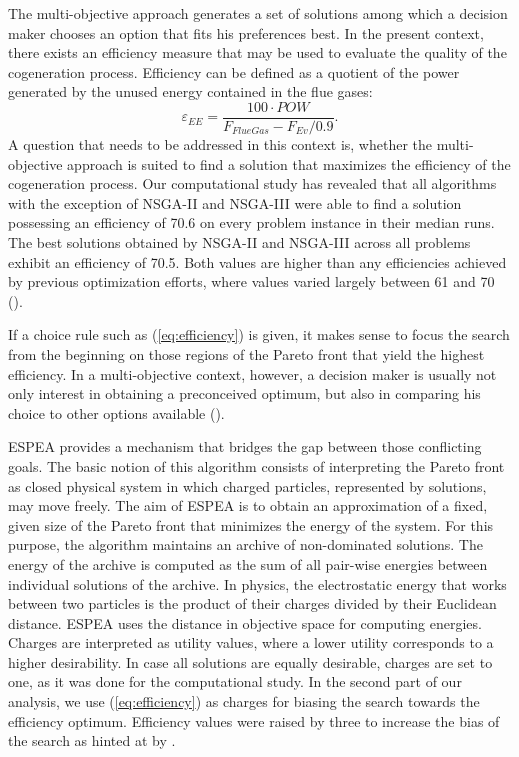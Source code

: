 The multi-objective approach generates a set of solutions among which a decision maker chooses an option that fits his preferences best. In the present context, there exists an efficiency measure that may be used to evaluate the quality of the cogeneration process. Efficiency can be defined as a quotient of the power generated by the unused energy contained in the flue gases:
%
\begin{equation}
\label{eq:efficiency}
\varepsilon_{EE} = \frac{100 \cdot POW}{F_{FlueGas} - F_{Ev}/0.9}.
\end{equation}
%
A question that needs to be addressed in this context is, whether the multi-objective approach is suited to find a solution that maximizes the efficiency of the cogeneration process. Our computational study has revealed that all algorithms with the exception of NSGA-II and NSGA-III were able to find a solution possessing an efficiency of 70.6 on every problem instance in their median runs. The best solutions obtained by NSGA-II and NSGA-III across all problems exhibit an efficiency of 70.5. Both values are higher than any efficiencies achieved by previous optimization efforts, where values varied largely between 61 and 70 (\cite[Fig. 11]{Seijo2016309}).

If a choice rule such as (\ref{eq:efficiency}) is given, it makes sense to focus the search from the beginning on those regions of the Pareto front that yield the highest efficiency. In a multi-objective context, however, a decision maker is usually not only interest in obtaining a preconceived optimum, but also in comparing his choice to other options available (\cite{roy1996multicriteria,kahneman1979prospect}).

ESPEA provides a mechanism that bridges the gap between those conflicting goals. The basic notion of this algorithm consists of interpreting the Pareto front as closed physical system in which charged particles, represented by solutions, may move freely. The aim of ESPEA is to obtain an approximation of a fixed, given size of the Pareto front that minimizes the energy of the system. For this purpose, the algorithm maintains an archive of non-dominated solutions. The energy of the archive is computed as the sum of all pair-wise energies between individual solutions of the archive. In physics, the electrostatic energy that works between two particles is the product of their charges divided by their Euclidean distance. ESPEA uses the distance in objective space for computing energies. Charges are interpreted as utility values, where a lower utility corresponds to a higher desirability. In case all solutions are equally desirable, charges are set to one, as it was done for the computational study. In the second part of our analysis, we use (\ref{eq:efficiency}) as charges for biasing the search towards the efficiency optimum. Efficiency values were raised by three to increase the bias of the search as hinted at by \cite{espea}.

